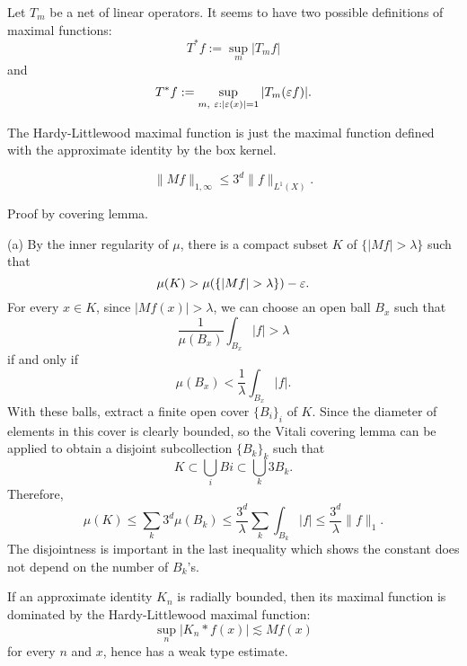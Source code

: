 \documentclass{../../large}
\begin{document}
Let $T_m$ be a net of linear operators.
It seems to have two possible definitions of maximal functions:
\[T^*f:=\sup_m|T_mf|\]
and
\[T^*f:=\sup_{m,\ \varepsilon:|\varepsilon(x)|=1}|T_m(\varepsilon f)|.\]

\begin{prb}
The Hardy-Littlewood maximal function is just the maximal function defined with the approximate identity by the box kernel.
\end{prb}

\begin{prb}
\[\|Mf\|_{1,\infty}\le 3^d\|f\|_{L^1(X)}.\]
\begin{parts}
\item Proof by covering lemma.
\end{parts}
\end{prb}
\begin{pf}
(a)
By the inner regularity of $\mu$, there is a compact subset $K$ of $\{|Mf|>\lambda\}$ such that
\[\mu(K)>\mu(\{|Mf|>\lambda\})-\e.\]
For every $x\in K$, since $|Mf(x)|>\lambda$, we can choose an open ball $B_x$ such that
\[\frac1{\mu(B_x)}\int_{B_x}|f|>\lambda\]
if and only if
\[\mu(B_x)<\frac1\lambda\int_{B_x}|f|.\]
With these balls, extract a finite open cover $\{B_i\}_i$ of $K$.
Since the diameter of elements in this cover is clearly bounded, so the Vitali covering lemma can be applied to obtain a disjoint subcollection $\{B_k\}_k$ such that
\[K\subset\bigcup_iBi\subset\bigcup_k3B_k.\]
Therefore,
\[\mu(K)
\le\sum_k3^d\mu(B_k)
\le\frac{3^d}\lambda\sum_k\int_{B_k}|f|
\le\frac{3^d}\lambda\|f\|_1.\]
The disjointness is important in the last inequality which shows the constant does not depend on the number of $B_k$'s.
\end{pf}



\begin{prb}
If an approximate identity $K_n$ is radially bounded, then its maximal function is dominated by the Hardy-Littlewood maximal function:
\[\sup_n|K_n*f(x)|\lesssim Mf(x)\]
for every $n$ and $x$, hence has a weak type estimate.
\end{prb}
\end{document}
